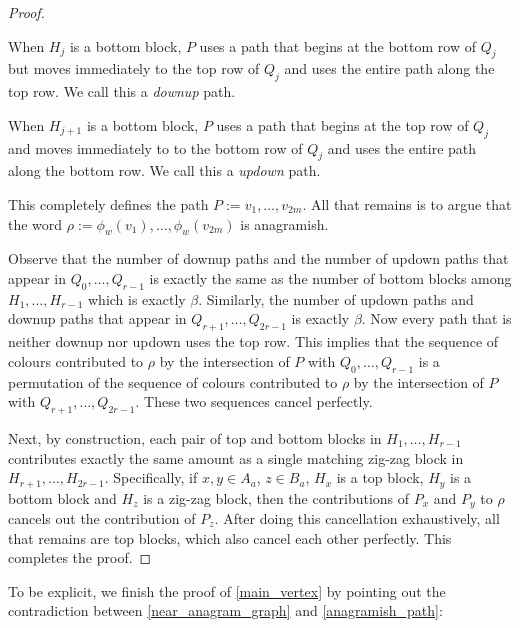 \documentclass{patmorin}
\begin{document}
\begin{proof}
    \begin{compactenum}
        \item When $H_j$ is a bottom block, $P$ uses a path that begins at the bottom row of $Q_j$ but moves immediately to the top row of $Q_j$ and uses the entire path along the top row. We call this a \emph{downup} path.
        \item When $H_{j+1}$ is a bottom block, $P$ uses a path that begins at the top row of $Q_j$ and moves immediately to to the bottom row of $Q_j$ and uses the entire path along the bottom row.  We call this a \emph{updown} path.
    \end{compactenum}
    This completely defines the path $P:=v_1,\ldots,v_{2m}$. All that remains is to argue that the word $\rho:=\phi_w(v_1),\ldots,\phi_w(v_{2m})$ is anagramish.

    Observe that the number of downup paths and the number of updown paths that appear in $Q_0,\ldots,Q_{r-1}$ is exactly the same as the number of bottom blocks among $H_1,\ldots,H_{r-1}$ which is exactly $\beta$.  Similarly, the number of updown paths and downup paths that appear in $Q_{r+1},\ldots,Q_{2r-1}$ is exactly $\beta$.  Now every path that is neither downup nor updown uses the top row.  This implies that the sequence of colours contributed to $\rho$ by  the intersection of $P$ with $Q_0,\ldots,Q_{r-1}$ is a permutation of the sequence of colours contributed to $\rho$ by the intersection of $P$ with $Q_{r+1},\ldots,Q_{2r-1}$.  These two sequences cancel perfectly.

    Next, by construction, each pair of top and bottom blocks in $H_1,\ldots,H_{r-1}$ contributes exactly the same amount as a single matching zig-zag block in $H_{r+1},\ldots,H_{2r-1}$.  Specifically, if $x,y\in A_a$, $z\in B_a$, $H_x$ is a top block, $H_y$ is a bottom block and $H_z$ is a zig-zag block, then the contributions of $P_x$ and $P_y$ to $\rho$ cancels out the contribution of $P_z$. After doing this cancellation exhaustively, all that remains are top blocks, which also cancel each other perfectly.  This completes the proof.
\end{proof}


To be explicit, we finish the proof of \cref{main_vertex} by pointing out the contradiction between \cref{near_anagram_graph} and \cref{anagramish_path}:
\end{document}
